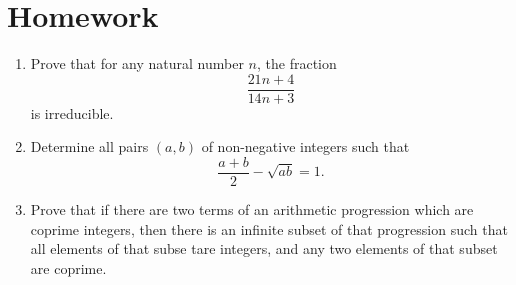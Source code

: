 \documentclass{article}
\begin{document}
\section{Homework}
\begin{enumerate}
	\item Prove that for any natural number $n$, the fraction
	      \[\frac{21n+4}{14n+3}\]
	      is irreducible.
	\item Determine all pairs $(a,b)$ of non-negative integers such that
	      \[\frac{a+b}2-\sqrt{ab}=1.\]
	\item Prove that if there are two terms of an arithmetic progression which are
	      coprime integers, then there is an infinite subset of that
	      progression such that all elements of that subse tare integers, and
	      any two elements of that subset are coprime.
\end{enumerate}
\end{document}
